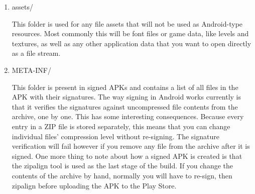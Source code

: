 \begin{enumerate}
\item{assets/}

This folder is used for any file assets that will not be used as Android-type resources. Most commonly this will be font files or game data, like levels and textures, as well as any other application data that you want to open directly as a file stream.
\item{META-INF/}

This folder is present in signed APKs and contains a list of all files in the APK with their signatures. The way signing in Android works currently is that it verifies the signatures against uncompressed file contents from the archive, one by one.
This has some interesting consequences. Because every entry in a ZIP file is stored separately, this means that you can change individual files’ compression level without re-signing. The signature verification will fail however if you remove any file from the archive after it is signed.
One more thing to note about how a signed APK is created is that the zipalign tool is used as the last stage of the build. If you change the contents of the archive by hand, normally you will have to re-sign, then zipalign before uploading the APK to the Play Store.

\end{enumerate}






